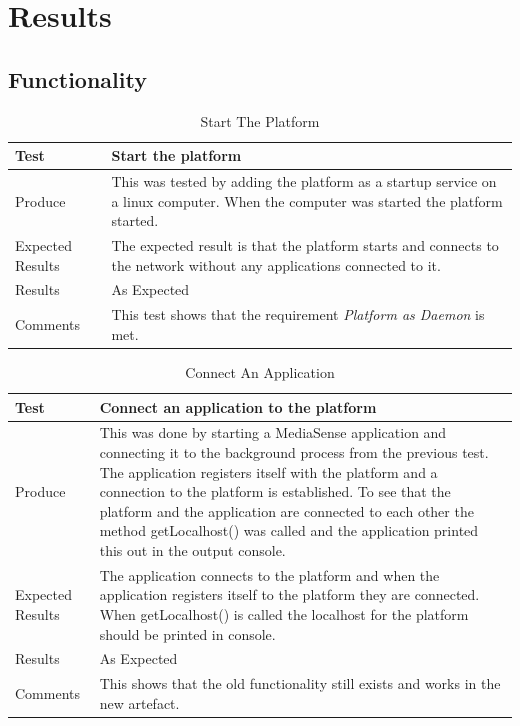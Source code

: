 \section{Results}
\subsection{Functionality}

\begin{table}[!h]
    \begin{tabular}{ | l | p{12cm} |}
    \hline
    Test 	 				& 		 Start the platform\\ \hline
	Produce  				& 		 This was tested by adding the platform as a startup service on a linux computer. When the computer was started the platform started.\\ \hline
	Expected Results  		& 		 The expected result is that the platform starts and connects to the network without any applications connected to it. \\ \hline
	Results 				& 		 As Expected\\ \hline
	Comments				& 		 This test shows that the requirement \emph{Platform as Daemon} is met.\\ \hline
    \end{tabular}
    \caption{Start The Platform}
\end{table}

\begin{table}[!h]
    \begin{tabular}{ | l | p{12cm} |}
    \hline
    Test 	 				& 		 Connect an application to the platform \\ \hline
	Produce  				& 		 This was done by starting a MediaSense application and connecting it to the background process from the previous test. The application registers itself with the platform and a connection to the platform is established. To see that the platform and the application are connected to each other the method getLocalhost() was called and the application printed this out in the output console. \\ \hline
	Expected Results  		& 		 The application connects to the platform and when the application registers itself to the platform they are connected. When getLocalhost() is called the localhost for the platform should be printed in console. \\ \hline
	Results 				& 		 As Expected\\ \hline
	Comments				& 		 This shows that the old functionality still exists and works in the new artefact.\\ \hline
    \end{tabular}
    \caption{Connect An Application}
\end{table}

